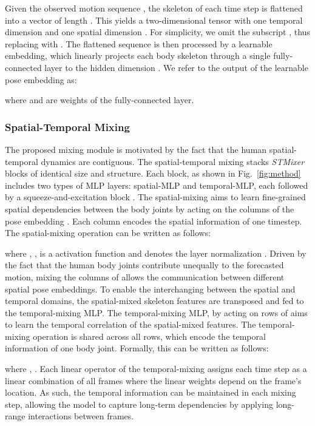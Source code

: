 \documentclass{article}
\begin{document}
Given the observed motion sequence , the skeleton of each time step  is flattened into a vector of length . This yields a two-dimensional tensor  with one temporal dimension  and one spatial dimension . For simplicity, we omit the subscript , thus replacing  with . The flattened sequence  is then processed by a learnable embedding, which linearly projects each body skeleton  through a single fully-connected layer to the hidden dimension . We refer to the output of the learnable pose embedding  as: 

where  and  are weights of the fully-connected layer. 

\subsubsection{Spatial-Temporal Mixing}
 The proposed mixing module is motivated by the fact that the human spatial-temporal dynamics are contiguous. The spatial-temporal mixing stacks  \textit{STMixer} blocks of identical size and structure. Each block, as shown in Fig.~\ref{fig:method} includes two types of MLP layers: spatial-MLP and temporal-MLP, each followed by a squeeze-and-excitation block \cite{hu2018squeeze}. The spatial-mixing aims to learn fine-grained spatial dependencies between the body joints by acting on the columns of the pose embedding . Each column encodes the spatial information of one timestep. The spatial-mixing operation can be written as follows:

 where , ,  is a  activation function \cite{hendrycks2016gaussian} and  denotes the layer normalization \cite{ba2016layer}.
 Driven by the fact that the human body joints contribute unequally to the forecasted motion, mixing the columns of  allows the communication between different spatial pose embeddings. To enable the interchanging between the spatial and temporal domains, the spatial-mixed skeleton features  are transposed and fed to the temporal-mixing MLP. The temporal-mixing MLP, by acting on rows of  aims to learn the temporal correlation of the spatial-mixed features. The temporal-mixing operation is shared across all rows, which encode the temporal information of one body joint. Formally, this can be written as follows: 
  
 where , . Each linear operator of the temporal-mixing assigns each time step as a linear combination of all frames where the linear weights depend on the frame’s location.  As such, the temporal information can be maintained in each mixing step, allowing the model to capture long-term dependencies by applying long-range interactions between frames.
\end{document}
